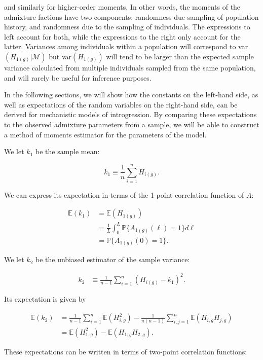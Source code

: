 \documentclass[11pt]{amsart}
\begin{document}
and similarly for higher-order moments.  In other words, the moments of the admixture factions have two components: randomness due sampling of population history, and randomness due to the sampling of individuals.  The expressions to left account for both, while the expressions to the right only account for the latter.  Variances among individuals within a population will correspond to var$(H_{1(g)}|\mathcal{M})$ but var$(H_{1(g)})$ will tend to be larger than the expected sample variance calculated from multiple individuals sampled from the same population, and will rarely be useful for inference purposes.

In the following sections, we will show how the constants on the left-hand side, as well as expectations of the random variables on the right-hand side, can be derived for mechanistic models of introgression.
By comparing these expectations to the observed admixture parameters from a sample, we will be able to construct a method of moments estimator for the  parameters of the model. 

We let $k_1$ be the sample mean:

$$
	k_1\equiv \frac{1}{n}\sum_{i=1}^n H_{i(g)}.
$$

We can express its expectation in terms of the 1-point correlation function of $A$:

\begin{align*}
	\mathbb{E}(k_1)
	&=\mathbb{E}(H_{1(g)})\\
	&=\frac{1}{L}\int_0^L \mathbb{P}\{A_{1(g)}(\ell)=1\}d\ell\\
	&=\mathbb{P}\{A_{1(g)}(0)=1\}.
\end{align*}

We let $k_2$ be the unbiased estimator of the sample variance:

\begin{align*}
k_2&\equiv\frac{1}{n-1}\sum_{i=1}^n\left(H_{i(g)}-k_1\right)^2.
\end{align*}

Its expectation is given by

\begin{align*}
	\mathbb{E}(k_2)
	&=\frac{1}{n-1}\sum_{i=1}^n \mathbb{E}(H_{i,g}^2)-\frac{1}{n(n-1)}\sum_{i,j=1}^n \mathbb{E}(H_{i,g}H_{j,g})\\
	&=\mathbb{E}(H_{1,g}^2)-\mathbb{E}(H_{1,g}H_{2,g}).
\end{align*}

These expectations can be written in terms of two-point correlation functions:
\end{document}
